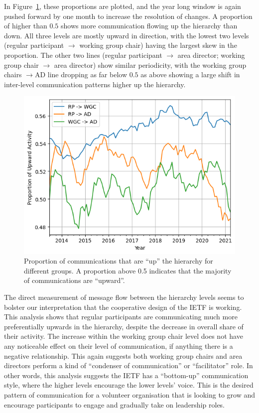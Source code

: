 \documentclass[twocolumn,10pt]{article}
\newlength{\figureWidthOneColumn}
\begin{document}
In Figure~\ref{fig:inter_strata}, these proportions are plotted, and the
year long window is again pushed forward by one month to increase the
resolution of changes. A proportion of higher than $0.5$ shows more
communication flowing up the hierarchy than down. All three levels are
mostly upward in direction, with the lowest two levels (regular participant
$\rightarrow$ working group chair) having the largest skew in the
proportion. The other two lines (regular participant $\rightarrow$ area
director; working group chair $\rightarrow$ area director) show similar
periodicity, with the working group chairs $\rightarrow$AD line dropping as
far below $0.5$ as above showing a large shift in inter-level communication
patterns higher up the hierarchy.

\begin{figure}[t]
  \centering
  \includegraphics[width=\figureWidthOneColumn]{figures-prev/icwsm-2024/up_hierarchy_communication_ratios.png}
  \caption{
    Proportion of communications that are ``up'' the hierarchy for different
    groups. A proportion above 0.5 indicates that the majority of
    communications are ``upward''.
  }
  \label{fig:inter_strata}
\end{figure}

The direct measurement of message flow between the hierarchy levels seems
to bolster our interpretation that the cooperative design of the IETF is
working. This analysis shows that regular participants are communicating
much more preferentially upwards in the hierarchy, despite the decrease in
overall share of their activity. The increase within the working group
chair level does not have any noticeable effect on their level of
communication, if anything there is a negative relationship. This again
suggests both working group chairs and area directors perform a kind of
``condenser of communication'' or ``facilitator'' role. In other words,
this analysis suggests the IETF has a ``bottom-up'' communication style,
where the higher levels encourage the lower levels' voice.  This is the
desired pattern of communication for a volunteer organisation that is
looking to grow and encourage participants to engage and gradually take on
leadership roles.
\end{document}
